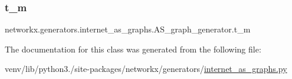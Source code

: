 \subsubsection{\texorpdfstring{t\+\_\+m}{t\_m}}
{\footnotesize\ttfamily networkx.\+generators.\+internet\+\_\+as\+\_\+graphs.\+A\+S\+\_\+graph\+\_\+generator.\+t\+\_\+m}



The documentation for this class was generated from the following file\+:\begin{DoxyCompactItemize}
\item 
venv/lib/python3./site-\/packages/networkx/generators/\hyperlink{internet__as__graphs_8py}{internet\+\_\+as\+\_\+graphs.\+py}\end{DoxyCompactItemize}
